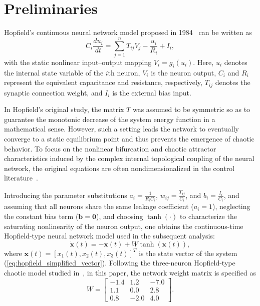 \documentclass[10pt,twocolumn]{article}
\theoremstyle{definition}
\begin{document}
\section{Preliminaries}
\label{sec:preliminaries}
Hopfield's continuous neural network model proposed in 1984~\cite{hopfield1984neurons} can be written as
\begin{equation}
	C_i \frac{du_i}{dt} = \sum_{j=1}^{n} T_{ij} V_j - \frac{u_i}{R_i} + I_i,
	\label{eq:hopfield_original_1}
\end{equation}
with the static nonlinear input--output mapping $V_i = g_i(u_i)$. Here, $u_i$ denotes the internal state variable of the $i$th neuron, $V_i$ is the neuron output, $C_i$ and $R_i$ represent the equivalent capacitance and resistance, respectively, $T_{ij}$ denotes the synaptic connection weight, and $I_i$ is the external bias input.

In Hopfield's original study, the matrix $T$ was assumed to be symmetric so as to guarantee the monotonic decrease of the system energy function in a mathematical sense. However, such a setting leads the network to eventually converge to a static equilibrium point and thus prevents the emergence of chaotic behavior. To focus on the nonlinear bifurcation and chaotic attractor characteristics induced by the complex internal topological coupling of the neural network, the original equations are often nondimensionalized in the control literature~\cite{LI2013a, mahmoud2021analysis}.

Introducing the parameter substitutions $a_i = \frac{1}{R_i C_i}$, $w_{ij} = \frac{T_{ij}}{C_i}$, and $b_i = \frac{I_i}{C_i}$, and assuming that all neurons share the same leakage coefficient ($a_i=1$), neglecting the constant bias term ($\mathbf{b}=\mathbf{0}$), and choosing $\tanh(\cdot)$ to characterize the saturating nonlinearity of the neuron output, one obtains the continuous-time Hopfield-type neural network model used in the subsequent analysis:
\begin{equation}
	\dot{\mathbf{x}}(t) = -\mathbf{x}(t) + W \tanh(\mathbf{x}(t)),
	\label{eq:hopfield_simplified_vector}
\end{equation}
where $\mathbf{x}(t) = [x_1(t), x_2(t), x_3(t)]^T$ is the state vector of the system (\ref{eq:hopfield_simplified_vector}). Following the three-neuron Hopfield-type chaotic model studied in~\cite{mahmoud2021analysis}, in this paper, the network weight matrix is specified as
\begin{equation}
	W = \begin{bmatrix}
		-1.4 & 1.2 & -7.0 \\
		1.1 & 0.0 & 2.8 \\
		0.8 & -2.0 & 4.0
	\end{bmatrix}.
	\label{eq:weight_matrix}
\end{equation}
\end{document}
